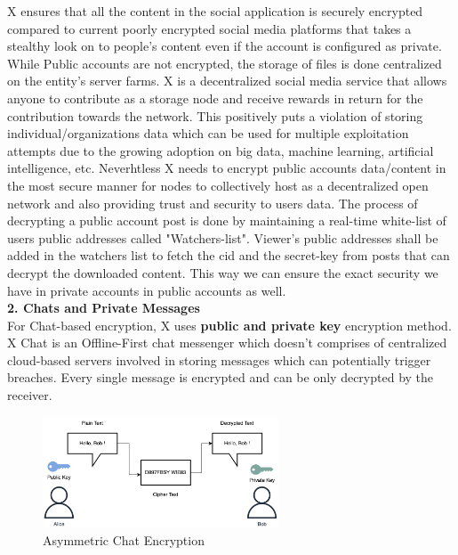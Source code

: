 \documentclass[letterpaper,11pt]{article}
\begin{document}
X ensures that all the content in the social application is securely encrypted compared to current poorly encrypted social media platforms that takes a stealthy look on to people's content even if the account is configured as private. While Public accounts are not encrypted, the storage of files is done centralized on the entity's server farms. X is a decentralized social media service that allows anyone to contribute as a storage node and receive rewards in return for the contribution towards the network. This positively puts a violation of storing individual/organizations data which can be used for multiple exploitation attempts due to the growing adoption on big data, machine learning, artificial intelligence, etc.  Neverhtless X needs to encrypt public accounts data/content in the most secure manner for nodes to collectively host as a decentralized open network and also providing trust and security to users data. The process of decrypting a public account post is done by maintaining a real-time white-list of users public addresses called "Watchers-list". Viewer's public addresses shall be added in the watchers list to fetch the cid and the secret-key from posts that can decrypt the downloaded content. This way we can ensure the exact security we have in private accounts in public accounts as well.\\


\textbf{2. Chats and Private Messages}\\

For Chat-based encryption, X uses \textbf{public and private key} encryption method. X Chat is an Offline-First chat messenger which doesn't comprises of centralized cloud-based servers involved in storing messages which can potentially trigger breaches. Every single message is encrypted and can be only decrypted by the receiver.\\

\begin{figure}[H]
\begin{center}
\includegraphics[width=7cm]{chat}
\caption{Asymmetric Chat Encryption}
\end{center}
\end{figure}
\end{document}
